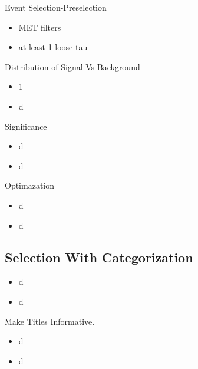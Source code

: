 \documentclass{beamer}
\begin{document}
\begin{frame}{Event Selection-Preselection}
    \begin{itemize}
    \item
        MET filters
    \item
        at least 1 loose tau
    \end{itemize}
\end{frame}


\begin{frame}{Distribution of Signal Vs Background}
    \begin{itemize}
    \item
      1 
    \item
       d 
    \end{itemize}
\end{frame}



\begin{frame}{Significance}
    \begin{itemize}
    \item
       d
    \item
        d
    \end{itemize}
\end{frame}



\begin{frame}{Optimazation}
    \begin{itemize}
    \item
       d
    \item
        d
    \end{itemize}
\end{frame}


\subsection{Selection With Categorization}


\begin{frame}{}
    \begin{itemize}
    \item
       d
    \item
        d
    \end{itemize}
\end{frame}

\begin{frame}{Make Titles Informative.}
    \begin{itemize}
    \item
       d
    \item
        d
    \end{itemize}
\end{frame}
\end{document}
